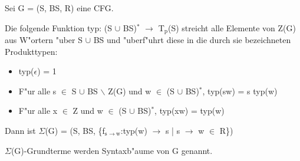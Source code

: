 \documentclass[11pt]{article}
\begin{document}
Sei G = (S, BS, R) eine CFG.

Die folgende Funktion typ: (S $\cup$ BS)$^{\text{*}}$ $\to$ T$_{\text{p}}$(S) streicht alle Elemente von Z(G) aus W"ortern "uber S $\cup$ BS und "uberf"uhrt diese
in die durch sie bezeichneten Produkttypen:

\begin{itemize}
\item typ($\epsilon$) = 1
\item F"ur alle s $\in$ S $\cup$ BS $\backslash$ Z(G) und w $\in$ (S $\cup$ BS)$^{\text{*}}$, typ(sw) = s \texttimes{} typ(w)
\item F"ur alle x $\in$ Z und w $\in$ (S $\cup$ BS)$^{\text{*}}$, typ(xw) = typ(w)
\end{itemize}

Dann ist $\Sigma$(G) = (S, BS, \{f$_{\text{s }\to\ \text{w}}$:typ(w) $\to$ s | s $\to$ w $\in$ R\})


$\Sigma$(G)-Grundterme werden Syntaxb"aume von G genannt.
\end{document}
